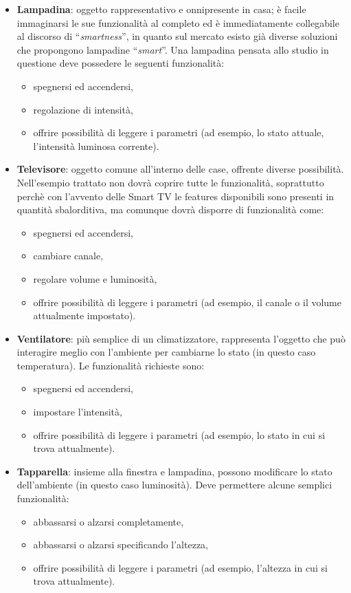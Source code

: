 \documentclass[12pt,a4paper,openright,oneside]{report}
\newcommand{\quotes}[1]{``#1''}
\begin{document}
\begin{itemize}
	\item \textbf{Lampadina}: oggetto rappresentativo e onnipresente in casa; è facile immaginarsi le sue funzionalità al completo ed è immediatamente collegabile al discorso di \quotes{\textit{smartness}}, in quanto sul mercato esisto già diverse soluzioni che propongono lampadine \quotes{\textit{smart}}. Una lampadina pensata allo studio in questione deve possedere le seguenti funzionalità:
	\begin{itemize}
		\setlength\itemsep{-0.0em}
		\item spegnersi ed accendersi,
		\item regolazione di intensità,
		\item offrire possibilità di leggere i parametri (ad esempio, lo stato attuale, l'intensità luminosa corrente).
	\end{itemize}
	
	\item \textbf{Televisore}: oggetto comune all'interno delle case, offrente diverse possibilità. Nell'esempio trattato non dovrà coprire tutte le funzionalità, soprattutto perchè con l'avvento delle Smart TV le features disponibili sono presenti in quantità sbalorditiva, ma comunque dovrà disporre di funzionalità come:
	\begin{itemize}
		\setlength\itemsep{-0.0em}
		\item spegnersi ed accendersi,
		\item cambiare canale,
		\item regolare volume e luminosità,
		\item offrire possibilità di leggere i parametri (ad esempio, il canale o il volume attualmente impostato).
	\end{itemize}
	
	\item \textbf{Ventilatore}: più semplice di un climatizzatore, rappresenta l'oggetto che può interagire meglio con l'ambiente per cambiarne lo stato (in questo caso temperatura). Le funzionalità richieste sono:
	\begin{itemize}
		\setlength\itemsep{-0.0em}
		\item spegnersi ed accendersi,
		\item impostare l'intensità,
		\item offrire possibilità di leggere i parametri (ad esempio, lo stato in cui si trova attualmente).
	\end{itemize}
	
	\item \textbf{Tapparella}: insieme alla finestra e lampadina, possono modificare lo stato dell'ambiente (in questo caso luminosità). Deve permettere alcune semplici funzionalità:
	\begin{itemize}
		\setlength\itemsep{-0.0em}
		\item abbassarsi o alzarsi completamente,
		\item abbassarsi o alzarsi specificando l'altezza,
		\item offrire possibilità di leggere i parametri (ad esempio, l'altezza in cui si trova attualmente).
	\end{itemize}
\end{itemize}
\end{document}
